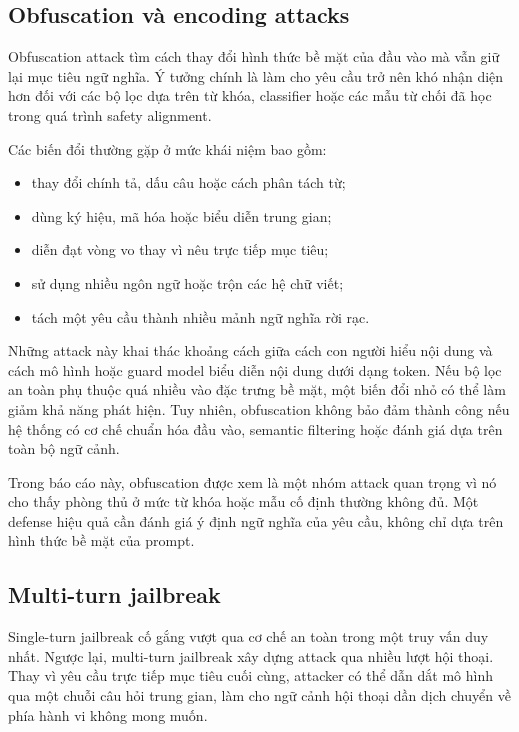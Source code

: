 \subsection{Obfuscation và encoding attacks}
\label{subsec:obfuscation-encoding-attacks}

Obfuscation attack tìm cách thay đổi hình thức bề mặt của đầu vào mà vẫn
giữ lại mục tiêu ngữ nghĩa. Ý tưởng chính là làm cho yêu cầu trở nên khó
nhận diện hơn đối với các bộ lọc dựa trên từ khóa, classifier hoặc các mẫu
từ chối đã học trong quá trình safety alignment.

Các biến đổi thường gặp ở mức khái niệm bao gồm:

\begin{itemize}[leftmargin=1.2cm]
    \item thay đổi chính tả, dấu câu hoặc cách phân tách từ;
    \item dùng ký hiệu, mã hóa hoặc biểu diễn trung gian;
    \item diễn đạt vòng vo thay vì nêu trực tiếp mục tiêu;
    \item sử dụng nhiều ngôn ngữ hoặc trộn các hệ chữ viết;
    \item tách một yêu cầu thành nhiều mảnh ngữ nghĩa rời rạc.
\end{itemize}

Những attack này khai thác khoảng cách giữa cách con người hiểu nội dung
và cách mô hình hoặc guard model biểu diễn nội dung dưới dạng token. Nếu
bộ lọc an toàn phụ thuộc quá nhiều vào đặc trưng bề mặt, một biến đổi nhỏ
có thể làm giảm khả năng phát hiện. Tuy nhiên, obfuscation không bảo đảm
thành công nếu hệ thống có cơ chế chuẩn hóa đầu vào, semantic filtering
hoặc đánh giá dựa trên toàn bộ ngữ cảnh.

Trong báo cáo này, obfuscation được xem là một nhóm attack quan trọng vì
nó cho thấy phòng thủ ở mức từ khóa hoặc mẫu cố định thường không đủ. Một
defense hiệu quả cần đánh giá ý định ngữ nghĩa của yêu cầu, không chỉ dựa
trên hình thức bề mặt của prompt.

\subsection{Multi-turn jailbreak}
\label{subsec:multi-turn-jailbreak}

Single-turn jailbreak cố gắng vượt qua cơ chế an toàn trong một truy vấn
duy nhất. Ngược lại, multi-turn jailbreak xây dựng attack qua nhiều lượt
hội thoại. Thay vì yêu cầu trực tiếp mục tiêu cuối cùng, attacker có thể
dẫn dắt mô hình qua một chuỗi câu hỏi trung gian, làm cho ngữ cảnh hội
thoại dần dịch chuyển về phía hành vi không mong muốn.

